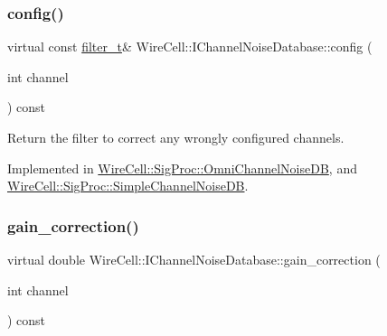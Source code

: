 \mbox{\label{class_wire_cell_1_1_i_channel_noise_database_af6887aa00ed134c7fcb1ee85bd950311}} 
\subsubsection{\texorpdfstring{config()}{config()}}
{\footnotesize\ttfamily virtual const \hyperlink{class_wire_cell_1_1_i_channel_noise_database_a0acbae29743542eb1c652f7a56e692f5}{filter\+\_\+t}\& Wire\+Cell\+::\+I\+Channel\+Noise\+Database\+::config (\begin{DoxyParamCaption}\item[{int}]{channel }\end{DoxyParamCaption}) const\hspace{0.3cm}{\ttfamily [pure virtual]}}



Return the filter to correct any wrongly configured channels. 



Implemented in \hyperlink{class_wire_cell_1_1_sig_proc_1_1_omni_channel_noise_d_b_acc904d0a6472acede55bd40ef8b6cd01}{Wire\+Cell\+::\+Sig\+Proc\+::\+Omni\+Channel\+Noise\+DB}, and \hyperlink{class_wire_cell_1_1_sig_proc_1_1_simple_channel_noise_d_b_a3eabaf3d48c127aaa6c594c682e6a77a}{Wire\+Cell\+::\+Sig\+Proc\+::\+Simple\+Channel\+Noise\+DB}.

\mbox{\label{class_wire_cell_1_1_i_channel_noise_database_ad2cdf46aea4ac11f8b7d097bd19c2e80}} 
\subsubsection{\texorpdfstring{gain\+\_\+correction()}{gain\_correction()}}
{\footnotesize\ttfamily virtual double Wire\+Cell\+::\+I\+Channel\+Noise\+Database\+::gain\+\_\+correction (\begin{DoxyParamCaption}\item[{int}]{channel }\end{DoxyParamCaption}) const\hspace{0.3cm}{\ttfamily [pure virtual]}}

